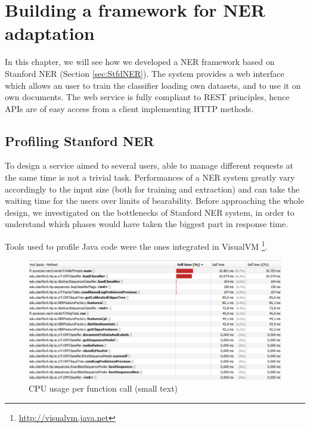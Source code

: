 \documentclass[a4paper,11pt]{report}
\begin{document}
\chapter{Building a framework for NER adaptation}

In this chapter, we will see how we developed a NER framework based on Stanford NER (Section \ref{sec:StfdNER}). The system provides a web interface which allows an user to train the classifier loading own datasets, and to use it on own documents. %
The web service is fully compliant to REST principles, %
hence APIs are of easy access from a client implementing HTTP methods. 

\section{Profiling Stanford NER}
To design a service aimed to several users, able to manage different requests at the same time is not a trivial task. Performances of a NER system greatly vary accordingly to the input size (both for training and extraction) and can take the waiting time for the users over limits of bearability. Before approaching the whole design, we investigated on the bottlenecks of Stanford NER system, in order to understand which phases would have taken the biggest part in response time.

Tools used to profile Java code were the ones integrated in VisualVM \footnote{\url{http://visualvm.java.net}}.

\begin{figure}[htbp] 
\centering
\includegraphics[width=\textwidth]{functions}
\caption{CPU usage per function call (small text)}
\label{fig:profile1}
\end{figure}
\end{document}
